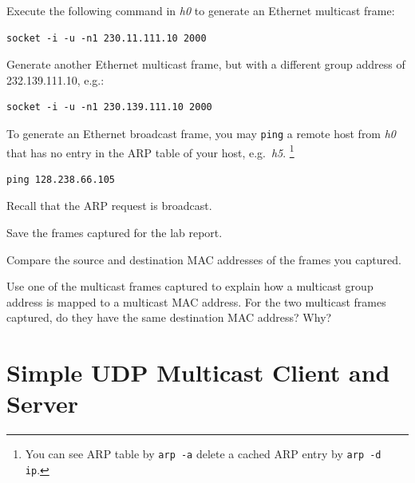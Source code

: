 \documentclass{../UTNetLab}
\begin{document}
    Execute the following command in \textit{h0} to generate an Ethernet multicast frame:

    \begin{lstlisting}[emph={your-host, remote-host}]
socket -i -u -n1 230.11.111.10 2000
    \end{lstlisting}

    Generate another Ethernet multicast frame, but with a different group address of {232.139.111.10}, e.g.:

    \begin{lstlisting}[emph={your-host, remote-host}]
socket -i -u -n1 230.139.111.10 2000
    \end{lstlisting}


    To generate an Ethernet broadcast frame, you may \lstinline{ping} a remote host from \textit{h0} that has no entry in the ARP table of your host, e.g.\ \textit{h5}.
    \footnote{You can see ARP table by \lstinline{arp -a} delete a cached ARP entry by \lstinline[emph={ip}]{arp -d ip}.}

    \begin{lstlisting}
ping 128.238.66.105
    \end{lstlisting}
    Recall that the ARP request is broadcast.%

    Save the frames captured for the lab report.

    \begin{report}
        \item Compare the source and destination MAC addresses of the frames you captured.

        \item Use one of the multicast frames captured to explain how a multicast group address is mapped to a multicast MAC address.
            For the two multicast frames captured, do they have the same destination MAC address?
            Why?
    \end{report}

\section{Simple UDP Multicast Client and Server}

    
\end{document}
